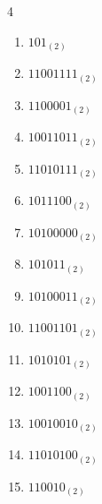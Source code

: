 \begin{multicols}{4}
\begin{enumerate}
        \phantom{$=44$}

  \item $101_{(2)}$

        \phantom{$=5$}

\columnbreak %

  \item $11001111_{(2)}$

        \phantom{$=207$}

  \item $1100001_{(2)}$

        \phantom{$=97$}

  \item $10011011_{(2)}$

        \phantom{$=155$}

  \item $11010111_{(2)}$

        \phantom{$=215$}

  \item $1011100_{(2)}$

        \phantom{$=92$}

  \item $10100000_{(2)}$

        \phantom{$=160$}

  \item $101011_{(2)}$

        \phantom{$=43$}

  \item $10100011_{(2)}$

        \phantom{$=163$}

  \item $11001101_{(2)}$

        \phantom{$=205$}

  \item $1010101_{(2)}$

        \phantom{$=85$}

  \item $1001100_{(2)}$

        \phantom{$=76$}

  \item $10010010_{(2)}$

        \phantom{$=146$}

  \item $11010100_{(2)}$

        \phantom{$=212$}

  \item $110010_{(2)}$


\end{enumerate}
\end{multicols}
